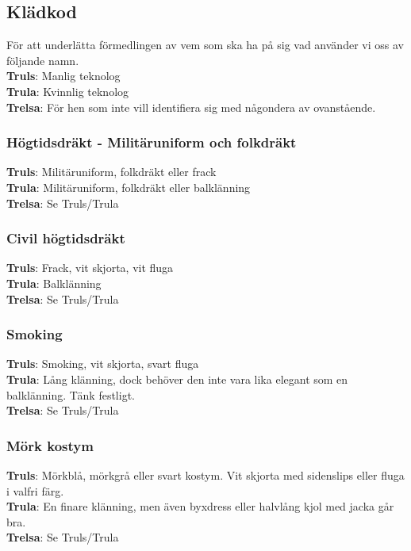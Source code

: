 \subsection*{Klädkod}
För att underlätta förmedlingen av vem som ska ha på sig vad använder vi oss av följande namn.\\

\textbf{Truls}: Manlig teknolog\\
\textbf{Trula}: Kvinnlig teknolog\\
\textbf{Trelsa}: För hen som inte vill identifiera sig med någondera av ovanstående.

\subsubsection*{Högtidsdräkt - Militäruniform och folkdräkt}

\textbf{Truls}: Militäruniform, folkdräkt eller frack\\
\textbf{Trula}: Militäruniform, folkdräkt eller balklänning\\
\textbf{Trelsa}: Se Truls/Trula

\subsubsection*{Civil högtidsdräkt}

\textbf{Truls}: Frack, vit skjorta, vit fluga\\
\textbf{Trula}: Balklänning\\
\textbf{Trelsa}: Se Truls/Trula

\subsubsection*{Smoking}
\textbf{Truls}: Smoking, vit skjorta, svart fluga\\
\textbf{Trula}: Lång klänning, dock behöver den inte vara lika elegant som en balklänning. Tänk festligt.\\
\textbf{Trelsa}: Se Truls/Trula

\subsubsection*{Mörk kostym}
\textbf{Truls}: Mörkblå, mörkgrå eller svart kostym. Vit skjorta med sidenslips eller fluga i valfri färg.\\
\textbf{Trula}: En finare klänning, men även byxdress eller halvlång kjol med jacka går bra.\\
\textbf{Trelsa}: Se Truls/Trula

